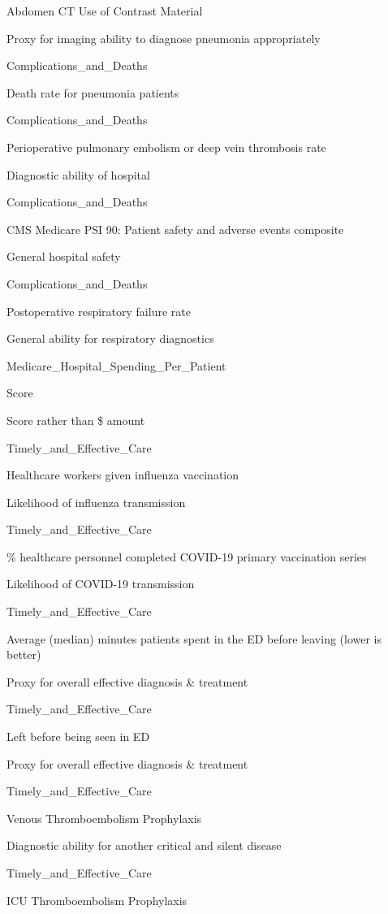 \documentclass[
]{article}
\begin{document}
Abdomen CT Use of Contrast Material

Proxy for imaging ability to diagnose pneumonia appropriately

Complications\_and\_Deaths

Death rate for pneumonia patients

Complications\_and\_Deaths

Perioperative pulmonary embolism or deep vein thrombosis rate

Diagnostic ability of hospital

Complications\_and\_Deaths

CMS Medicare PSI 90: Patient safety and adverse events composite

General hospital safety

Complications\_and\_Deaths

Postoperative respiratory failure rate

General ability for respiratory diagnostics

Medicare\_Hospital\_Spending\_Per\_Patient

Score

Score rather than \$ amount

Timely\_and\_Effective\_Care

Healthcare workers given influenza vaccination

Likelihood of influenza transmission

Timely\_and\_Effective\_Care

\% healthcare personnel completed COVID-19 primary vaccination series

Likelihood of COVID-19 transmission

Timely\_and\_Effective\_Care

Average (median) minutes patients spent in the ED before leaving (lower
is better)

Proxy for overall effective diagnosis \& treatment

Timely\_and\_Effective\_Care

Left before being seen in ED

Proxy for overall effective diagnosis \& treatment

Timely\_and\_Effective\_Care

Venous Thromboembolism Prophylaxis

Diagnostic ability for another critical and silent disease

Timely\_and\_Effective\_Care

ICU Thromboembolism Prophylaxis
\end{document}
